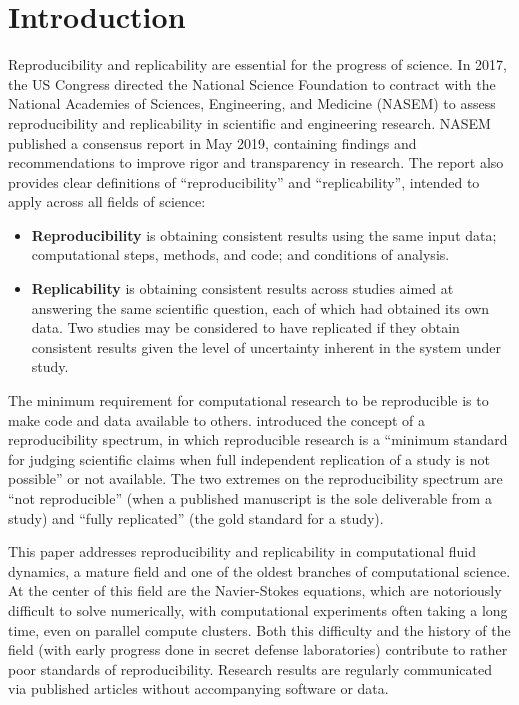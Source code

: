 \section{Introduction}

Reproducibility and replicability are essential for the progress of science.
In 2017, the US Congress directed the National Science Foundation to contract with the National Academies of Sciences, Engineering, and Medicine (NASEM) to assess reproducibility and replicability in scientific and engineering research.
NASEM published a consensus report\supercite{nasem_2019} in May 2019, containing findings and recommendations to improve rigor and transparency in research.
The report also provides clear definitions of ``reproducibility'' and ``replicability'', intended to apply across all fields of science:

\begin{itemize}
  \item[] \textbf{Reproducibility} is obtaining consistent results using the same input data; computational steps, methods, and code; and conditions of analysis.
  \item[] \textbf{Replicability} is obtaining consistent results across studies aimed at answering the same scientific question, each of which had obtained its own data. Two studies may be considered to have replicated if they obtain consistent results given the level of uncertainty inherent in the system under study.
\end{itemize}

The minimum requirement for computational research to be reproducible is to make code and data available to others.
\citet{peng_2011} introduced the concept of a reproducibility spectrum, in which reproducible research is a ``minimum standard for judging scientific claims when full independent replication of a study is not possible'' or not available.
The two extremes on the reproducibility spectrum are ``not reproducible'' (when a published manuscript is the sole deliverable from a study) and ``fully replicated'' (the gold standard for a study).

This paper addresses reproducibility and replicability in computational fluid dynamics, a mature field and one of the oldest branches of computational science. 
At the center of this field are the Navier-Stokes equations, which are notoriously difficult to solve numerically, with computational experiments often taking a long time, even on parallel compute clusters.
Both this difficulty and the history of the field (with early progress done in secret defense laboratories) contribute to rather poor standards of reproducibility.
Research results are regularly communicated via published articles without accompanying software or data.

